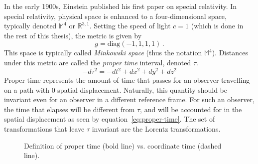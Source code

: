 In the early 1900s, Einstein published his first paper on special relativity. In special relativity, physical space is enhanced to a four-dimensional space, typically denoted $\mathbb{M}^4$ or $\mathbb{R}^{3,1}$. Setting the speed of light $c=1$ (which is done in the rest of this thesis), the metric is given by
\begin{equation}
    g = \mathrm{diag}(-1,1,1,1)\,.
\end{equation}
This space is typically called \textit{Minkowski space} (thus the notation $\mathbb{M}^4$). Distances under this metric are called the \textit{proper time} interval, denoted $\tau$.
\begin{equation}\label{eq:proper-time}
    -d\tau^2 = -dt^2 + dx^2 + dy^2 + dz^2
\end{equation}
Proper time represents the amount of time that passes for an observer travelling on a path with 0 spatial displacement. Naturally, this quantity should be invariant even for an observer in a different reference frame. For such an observer, the time that elapses will be different from $\tau$, and will be accounted for in the spatial displacement as seen by equation~\ref{eq:proper-time}. The set of transformations that leave $\tau$ invariant are the Lorentz transformations.
\begin{figure}
    \centering
    \caption{Definition of proper time (bold line) vs. coordinate time (dashed line).}
\end{figure}

